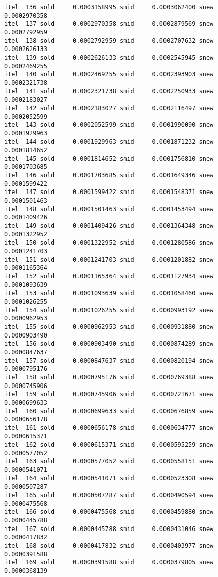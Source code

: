 \documentclass[
  12pt,
  letterpaper,
  DIV=11,
  numbers=noendperiod]{scrartcl}
\begin{document}
\begin{verbatim}
itel  136 sold     0.0003158995 smid     0.0003062400 snew     0.0002970358 
itel  137 sold     0.0002970358 smid     0.0002879569 snew     0.0002792959 
itel  138 sold     0.0002792959 smid     0.0002707632 snew     0.0002626133 
itel  139 sold     0.0002626133 smid     0.0002545945 snew     0.0002469255 
itel  140 sold     0.0002469255 smid     0.0002393903 snew     0.0002321738 
itel  141 sold     0.0002321738 smid     0.0002250933 snew     0.0002183027 
itel  142 sold     0.0002183027 smid     0.0002116497 snew     0.0002052599 
itel  143 sold     0.0002052599 smid     0.0001990090 snew     0.0001929963 
itel  144 sold     0.0001929963 smid     0.0001871232 snew     0.0001814652 
itel  145 sold     0.0001814652 smid     0.0001756810 snew     0.0001703685 
itel  146 sold     0.0001703685 smid     0.0001649346 snew     0.0001599422 
itel  147 sold     0.0001599422 smid     0.0001548371 snew     0.0001501463 
itel  148 sold     0.0001501463 smid     0.0001453494 snew     0.0001409426 
itel  149 sold     0.0001409426 smid     0.0001364348 snew     0.0001322952 
itel  150 sold     0.0001322952 smid     0.0001280586 snew     0.0001241703 
itel  151 sold     0.0001241703 smid     0.0001201882 snew     0.0001165364 
itel  152 sold     0.0001165364 smid     0.0001127934 snew     0.0001093639 
itel  153 sold     0.0001093639 smid     0.0001058460 snew     0.0001026255 
itel  154 sold     0.0001026255 smid     0.0000993192 snew     0.0000962953 
itel  155 sold     0.0000962953 smid     0.0000931880 snew     0.0000903490 
itel  156 sold     0.0000903490 smid     0.0000874289 snew     0.0000847637 
itel  157 sold     0.0000847637 smid     0.0000820194 snew     0.0000795176 
itel  158 sold     0.0000795176 smid     0.0000769388 snew     0.0000745906 
itel  159 sold     0.0000745906 smid     0.0000721671 snew     0.0000699633 
itel  160 sold     0.0000699633 smid     0.0000676859 snew     0.0000656178 
itel  161 sold     0.0000656178 smid     0.0000634777 snew     0.0000615371 
itel  162 sold     0.0000615371 smid     0.0000595259 snew     0.0000577052 
itel  163 sold     0.0000577052 smid     0.0000558151 snew     0.0000541071 
itel  164 sold     0.0000541071 smid     0.0000523308 snew     0.0000507287 
itel  165 sold     0.0000507287 smid     0.0000490594 snew     0.0000475568 
itel  166 sold     0.0000475568 smid     0.0000459880 snew     0.0000445788 
itel  167 sold     0.0000445788 smid     0.0000431046 snew     0.0000417832 
itel  168 sold     0.0000417832 smid     0.0000403977 snew     0.0000391588 
itel  169 sold     0.0000391588 smid     0.0000379805 snew     0.0000368139 

\end{verbatim}
\end{document}
